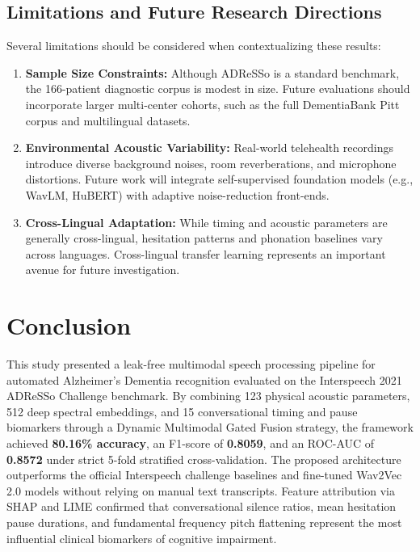 \documentclass[conference]{IEEEtran}
\begin{document}
\subsection{Limitations and Future Research Directions}
Several limitations should be considered when contextualizing these results:
\begin{enumerate}
    \item \textbf{Sample Size Constraints:} Although ADReSSo is a standard benchmark, the 166-patient diagnostic corpus is modest in size. Future evaluations should incorporate larger multi-center cohorts, such as the full DementiaBank Pitt corpus and multilingual datasets.
    \item \textbf{Environmental Acoustic Variability:} Real-world telehealth recordings introduce diverse background noises, room reverberations, and microphone distortions. Future work will integrate self-supervised foundation models (e.g., WavLM, HuBERT) with adaptive noise-reduction front-ends.
    \item \textbf{Cross-Lingual Adaptation:} While timing and acoustic parameters are generally cross-lingual, hesitation patterns and phonation baselines vary across languages. Cross-lingual transfer learning represents an important avenue for future investigation.
\end{enumerate}

\section{Conclusion}
This study presented a leak-free multimodal speech processing pipeline for automated Alzheimer's Dementia recognition evaluated on the Interspeech 2021 ADReSSo Challenge benchmark. By combining 123 physical acoustic parameters, 512 deep spectral embeddings, and 15 conversational timing and pause biomarkers through a Dynamic Multimodal Gated Fusion strategy, the framework achieved \textbf{80.16\% accuracy}, an F1-score of \textbf{0.8059}, and an ROC-AUC of \textbf{0.8572} under strict 5-fold stratified cross-validation. The proposed architecture outperforms the official Interspeech challenge baselines and fine-tuned Wav2Vec 2.0 models without relying on manual text transcripts. Feature attribution via SHAP and LIME confirmed that conversational silence ratios, mean hesitation pause durations, and fundamental frequency pitch flattening represent the most influential clinical biomarkers of cognitive impairment.
\end{document}

